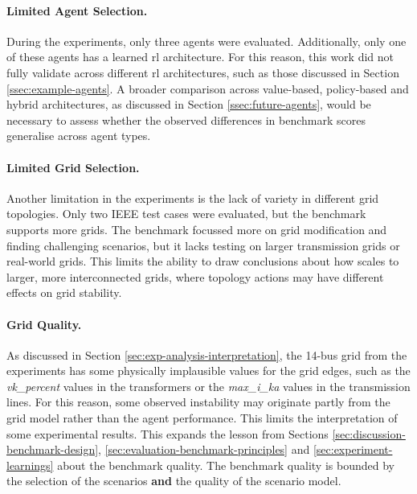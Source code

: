 \paragraph{Limited Agent Selection.}
During the experiments, only three agents were evaluated. Additionally, only one of these agents has a learned \ac{rl} architecture. For this reason, this work did not fully validate \benchmark across different \ac{rl} architectures, such as those discussed in Section \ref{ssec:example-agents}. A broader comparison across value-based, policy-based and hybrid architectures, as discussed in Section \ref{ssec:future-agents}, would be necessary to assess whether the observed differences in benchmark scores generalise across agent types.

\paragraph{Limited Grid Selection.}
Another limitation in the experiments is the lack of variety in different grid topologies. Only two IEEE test cases were evaluated, but the benchmark supports more grids. The benchmark focussed more on grid modification and finding challenging scenarios, but it lacks testing on larger transmission grids or real-world grids. This limits the ability to draw conclusions about how \benchmark scales to larger, more interconnected grids, where topology actions may have different effects on grid stability.

\paragraph{Grid Quality.}
As discussed in Section \ref{sec:exp-analysis-interpretation}, the 14-bus grid from the experiments has some physically implausible values for the grid edges, such as the \textit{vk\_percent} values in the transformers or the \textit{max\_i\_ka} values in the transmission lines. For this reason, some observed instability may originate partly from the grid model rather than the agent performance. This limits the interpretation of some experimental results. This expands the lesson from Sections \ref{sec:discussion-benchmark-design}, \ref{sec:evaluation-benchmark-principles} and \ref{sec:experiment-learnings} about the benchmark quality. The benchmark quality is bounded by the selection of the scenarios \textbf{and} the quality of the scenario model.

